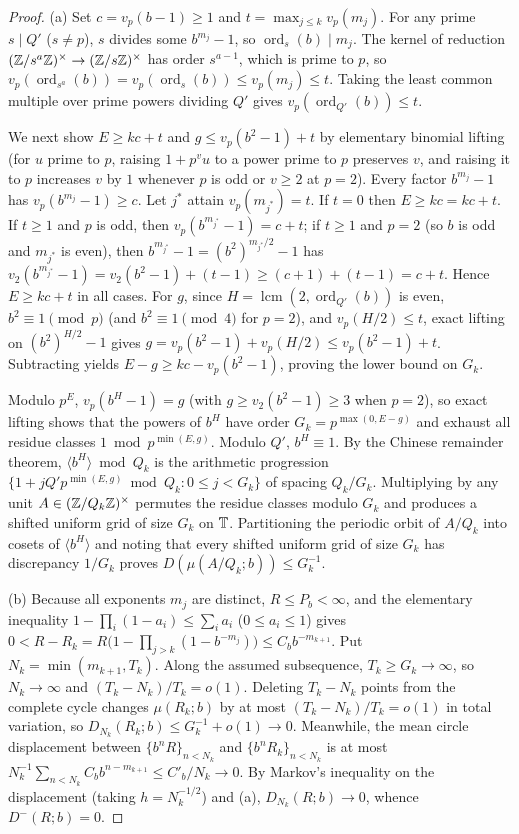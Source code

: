 \documentclass[11pt]{article}
\DeclareMathOperator{\ord}{ord}
\DeclareMathOperator{\lcm}{lcm}
\begin{document}
\begin{proof}
(a) Set $c=v_p(b-1)\ge1$ and $t=\max_{j\le k}v_p(m_j)$. For any prime $s\mid Q'$ ($s\ne p$), $s$ divides some $b^{m_j}-1$, so $\ord_s(b)\mid m_j$. The kernel of reduction $(\mathbb Z/s^a\mathbb Z)^\times\to(\mathbb Z/s\mathbb Z)^\times$ has order $s^{a-1}$, which is prime to $p$, so $v_p(\ord_{s^a}(b))=v_p(\ord_s(b))\le v_p(m_j)\le t$. Taking the least common multiple over prime powers dividing $Q'$ gives $v_p(\ord_{Q'}(b))\le t$.

We next show $E\ge kc+t$ and $g\le v_p(b^2-1)+t$ by elementary binomial lifting (for $u$ prime to $p$, raising $1+p^v u$ to a power prime to $p$ preserves $v$, and raising it to $p$ increases $v$ by $1$ whenever $p$ is odd or $v\ge2$ at $p=2$). Every factor $b^{m_j}-1$ has $v_p(b^{m_j}-1)\ge c$. Let $j^*$ attain $v_p(m_{j^*})=t$. If $t=0$ then $E\ge kc=kc+t$. If $t\ge1$ and $p$ is odd, then $v_p(b^{m_{j^*}}-1)=c+t$; if $t\ge1$ and $p=2$ (so $b$ is odd and $m_{j^*}$ is even), then $b^{m_{j^*}}-1=(b^2)^{m_{j^*}/2}-1$ has $v_2(b^{m_{j^*}}-1)=v_2(b^2-1)+(t-1)\ge(c+1)+(t-1)=c+t$. Hence $E\ge kc+t$ in all cases. For $g$, since $H=\lcm(2,\ord_{Q'}(b))$ is even, $b^2\equiv1\pmod p$ (and $b^2\equiv1\pmod4$ for $p=2$), and $v_p(H/2)\le t$, exact lifting on $(b^2)^{H/2}-1$ gives $g=v_p(b^2-1)+v_p(H/2)\le v_p(b^2-1)+t$. Subtracting yields $E-g\ge kc-v_p(b^2-1)$, proving the lower bound on $G_k$.

Modulo $p^E$, $v_p(b^H-1)=g$ (with $g\ge v_2(b^2-1)\ge3$ when $p=2$), so exact lifting shows that the powers of $b^H$ have order $G_k=p^{\max(0,E-g)}$ and exhaust all residue classes $1\bmod p^{\min(E,g)}$. Modulo $Q'$, $b^H\equiv1$. By the Chinese remainder theorem, $\langle b^H\rangle\bmod Q_k$ is the arithmetic progression $\{1+jQ'p^{\min(E,g)}\bmod Q_k:0\le j<G_k\}$ of spacing $Q_k/G_k$. Multiplying by any unit $A\in(\mathbb Z/Q_k\mathbb Z)^\times$ permutes the residue classes modulo $G_k$ and produces a shifted uniform grid of size $G_k$ on $\mathbb T$. Partitioning the periodic orbit of $A/Q_k$ into cosets of $\langle b^H\rangle$ and noting that every shifted uniform grid of size $G_k$ has discrepancy $1/G_k$ proves $D(\mu(A/Q_k;b))\le G_k^{-1}$.

(b) Because all exponents $m_j$ are distinct, $R\le P_b<\infty$, and the elementary inequality $1-\prod_i(1-a_i)\le\sum_i a_i$ ($0\le a_i\le1$) gives $0<R-R_k=R\bigl(1-\prod_{j>k}(1-b^{-m_j})\bigr)\le C_b b^{-m_{k+1}}$. Put $N_k=\min(m_{k+1},T_k)$. Along the assumed subsequence, $T_k\ge G_k\to\infty$, so $N_k\to\infty$ and $(T_k-N_k)/T_k=o(1)$. Deleting $T_k-N_k$ points from the complete cycle changes $\mu(R_k;b)$ by at most $(T_k-N_k)/T_k=o(1)$ in total variation, so $D_{N_k}(R_k;b)\le G_k^{-1}+o(1)\to0$. Meanwhile, the mean circle displacement between $\{b^n R\}_{n<N_k}$ and $\{b^n R_k\}_{n<N_k}$ is at most $N_k^{-1}\sum_{n<N_k}C_b b^{n-m_{k+1}}\le C'_b/N_k\to0$. By Markov's inequality on the displacement (taking $h=N_k^{-1/2}$) and (a), $D_{N_k}(R;b)\to0$, whence $D^-(R;b)=0$.
\end{proof}
\end{document}
